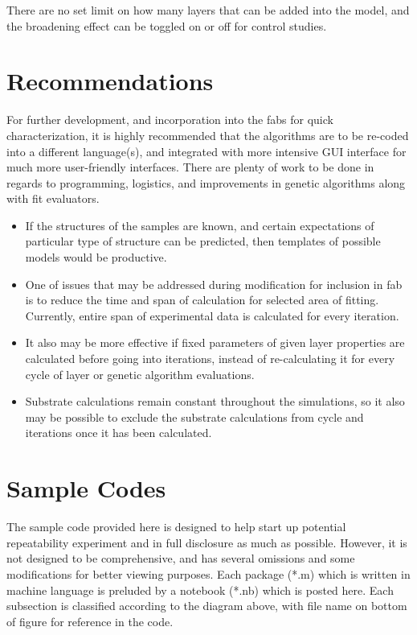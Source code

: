 There are no set limit on how many layers that can be added into the model, and the broadening effect can be toggled on or off for control studies.

\section{Recommendations}

For further development, and incorporation into the fabs for quick characterization, it is highly recommended that the algorithms are to be re-coded into a different language(s), and integrated with more intensive GUI interface for much more user-friendly interfaces.  There are plenty of work to be done in regards to programming, logistics, and improvements in genetic algorithms along with fit evaluators.

\begin{itemize}
\item  If the structures of the samples are known, and certain expectations of particular type of structure can be predicted, then templates of possible models would be productive.
\item One of issues that may be addressed during modification for inclusion in fab  is to reduce the time and span of calculation for selected area of fitting.  Currently, entire span of experimental data is calculated for every iteration.
\item  It also may be more effective if fixed parameters of given layer properties are calculated before going into iterations, instead of re-calculating it for every cycle of layer or genetic algorithm evaluations.
\item Substrate calculations remain constant throughout the simulations, so it also may be possible to exclude the substrate calculations from cycle and iterations once it has been calculated.
\end{itemize}

\section{Sample Codes}
The sample code provided here is designed to help start up potential repeatability experiment and in full disclosure as much as possible.  However, it is not designed to be comprehensive, and has several omissions and some modifications for better viewing purposes.  Each package (*.m) which is written in machine language is preluded by a notebook (*.nb)  which is posted here.  Each subsection is classified according to the diagram above, with file name on bottom of figure for reference in the code.

